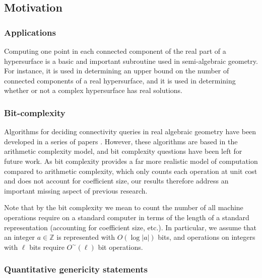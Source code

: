 \documentclass[sigconf]{acmart}
\newcommand{\ZZ}{{\mathbb{Z}}}
\newcommand{\softO}{{O^{\sim}}}
\begin{document}
\subsection{Motivation}
%
\subsubsection{Applications}
%
Computing one point in each connected component of the real part of a hypersurface is a basic and important subroutine used in semi-algebraic geometry. For instance, it is used in determining an upper bound on the number of connected components of a real hypersurface, and it is used in determining whether or not a complex hypersurface has real solutions. 

\subsubsection{Bit-complexity}
Algorithms for deciding connectivity queries in real algebraic geometry
have been developed in a series of papers
\cite{EMP,SchostMohabBabySteps2011,SchostMohabBabySteps2014,TWT}. However,
these algorithms are based in the arithmetic complexity model, and bit
complexity questions have been left for future work. As bit complexity
provides a far more realistic model of computation compared to arithmetic
complexity,  which only counts each operation at unit cost and does not
account for coefficient size, our results therefore address an important
missing aspect of previous research.

Note that by the bit complexity we mean to count the number of all machine
operations require on a standard computer in terms of the length of a
standard representation (accounting for coefficient size, etc.).  In
particular, we assume that an integer $a\in\ZZ$ is represented with
$O(\log|a|)$ bits, and operations on integers with $\ell$ bits require
$\softO(\ell)$ bit operations.

\subsubsection{Quantitative genericity statements}
%
\end{document}
